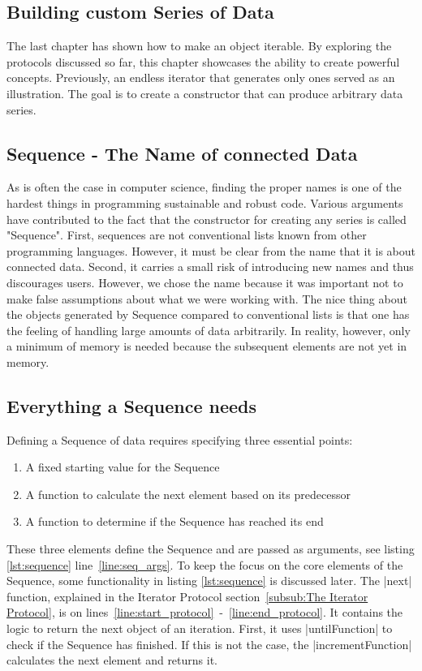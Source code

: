 \subsection{Building custom Series of Data}
\label{sub:Building custom Series of Data}
The last chapter has shown how to make an object iterable. By exploring the 
protocols discussed so far, this chapter showcases the ability to create 
powerful concepts. Previously, an endless iterator that generates only ones 
served as an illustration. The goal is to create a constructor that can 
produce arbitrary data series.

\subsection{Sequence - The Name of connected Data}
\label{sub:Sequence - The Name of connected Data}
As is often the case in computer science, finding the proper names is one of 
the hardest things in programming sustainable and robust code. Various arguments 
have contributed to the fact that the constructor for creating any series is 
called "Sequence". First, sequences are not conventional lists known from other 
programming languages. However, it must be clear from the name that it is about 
connected data. Second, it carries a small risk of introducing new names and
thus discourages users. However, we chose the name because it was important not
to make false assumptions about what we were working with. 
\newline
The nice thing about the objects generated by Sequence compared to
conventional lists is that one has the feeling of handling large 
amounts of data arbitrarily. In reality, however, only a minimum of memory is 
needed because the subsequent elements are not yet in memory.

\subsection{Everything a Sequence needs}
\label{sub:Everything a Sequence needs}
Defining a Sequence of data requires specifying three essential points:
\begin{enumerate}
  \item{A fixed starting value for the Sequence} 
  \item{A function to calculate the next element based on its predecessor} 
  \item{A function to determine if the Sequence has reached its end} 
\end{enumerate}
These three elements define the Sequence and are passed as arguments, 
see listing \ref{lst:sequence} line~\ref{line:seq_args}.
To keep the focus on the core elements of the Sequence, some functionality in 
listing \ref{lst:sequence} is discussed later. The |next| function, explained in 
the Iterator Protocol section~\ref{subsub:The Iterator Protocol}, 
is on lines~\ref{line:start_protocol}~-~\ref{line:end_protocol}. It contains the 
logic to return the next object of an iteration. First, it uses |untilFunction| 
to check if the Sequence has finished. If this is not the case, the
|incrementFunction| calculates the next element and returns it.

